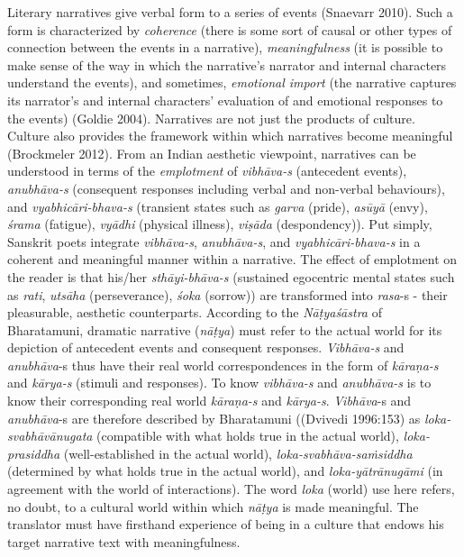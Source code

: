 Literary narratives give verbal form to a series of events (Snaevarr 2010). Such a form is characterized by \textsl{coherence} (there is some sort of causal or other types of connection between the events in a narrative), \textsl{meaningfulness }(it is possible to make sense of the way in which the narrative’s narrator and internal characters understand the events), and sometimes, \textsl{emotional import} (the narrative captures its narrator’s and internal characters’ evaluation of and emotional responses to the events) (Goldie 2004). Narratives are not just the products of culture. Culture also provides the framework within which narratives become meaningful (Brockmeler 2012). From an Indian aesthetic viewpoint, narratives can be understood in terms of the \textsl{emplotment} of \textsl{vibhāva-s} (antecedent events), \textsl{anubhāva-s} (consequent responses including verbal and non-verbal behaviours), and \textsl{vyabhicāri-bhava-s} (transient states such as \textsl{garva} (pride), \textsl{asūyā} (envy), \textsl{śrama} (fatigue), \textsl{vyādhi} (physical illness), \textsl{viṣāda} (despondency)). Put simply, Sanskrit poets integrate \textsl{vibhāva-s}, \textsl{anubhāva-s}, and \textsl{vyabhicāri-bhava-s} in a coherent and meaningful manner within a narrative. The effect of emplotment on the reader is that his/her \textsl{sthāyi-bhāva-s} (sustained egocentric mental states such as \textsl{rati}, \textsl{utsāha} (perseverance), \textsl{śoka} (sorrow)) are transformed into \textsl{rasa}-s - their pleasurable, aesthetic counterparts. According to the \textsl{Nāṭyaśāstra} of Bharatamuni, dramatic narrative (\textsl{nāṭya}) must refer to the actual world for its depiction of antecedent events and consequent responses. \textsl{Vibhāva-s} and \textsl{anubhāva}-s thus have their real world correspondences in the form of \textsl{kāraṇa-s} and \textsl{kārya-s} (stimuli and responses). To know \textsl{vibhāva-s} and \textsl{anubhāva-s} is to know their corresponding real world \textsl{kāraṇa-s} and \textsl{kārya-s}. \textsl{Vibhāva}-s and \textsl{anubhāva}-s are therefore described by Bharatamuni ((Dvivedi 1996:153) as \textsl{loka-svabhāvānugata} (compatible with what holds true in the actual world), \textsl{loka-prasiddha} (well-established in the actual world), \textsl{loka-svabhāva-saṁsiddha} (determined by what holds true in the actual world), and \textsl{loka-yātrānugāmi} (in agreement with the world of interactions). The word \textsl{loka} (world) use here refers, no doubt, to a cultural world within which \textsl{nāṭya} is made meaningful. The translator must have firsthand experience of being in a culture that endows his target narrative text with meaningfulness. 